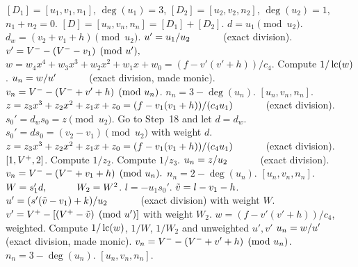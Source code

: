 \begin{algorithm}[H]
\caption{Genus 3 Split Model Degree 1 and 3 Addition with Two Up Adjusts\label{alg:g3explSPLIT13ADDUP2}}
\begin{algorithmic} [1]
\Require $[D_1] = [u_1,v_1,n_1]$, $\deg(u_1) = 3$, $[D_2] = [u_2,v_2,n_2]$, $\deg(u_2) = 1$, $n_1 + n_2 = 0$.
\Ensure $[D] = [u_n,v_n,n_n] = [D_1] + [D_2] $.
\algrule
\vspace{-2pt}
\State $d = u_1 \pmod{u_2}$.
    \State $d_w = (v_2 + v_1 + h) \pmod{u_2}$.
        \State $u' = u_1/u_2 \quad\quad\quad$ (exact division).
        \State $v' = V^{-} - (V^{-} - v_1) \pmod{u'},$
        \State $w = w_4x^4 + w_3x^3 + w_2x^2 +w_1x + w_0 = (f - v'(v' + h))/c_4$.
        \State Compute $1/\operatorname{lc}(w)$.
        \State $u_n = w/u' \quad\quad\quad$ (exact division, made monic).
        \State $v_n = V^{-} - (V^{-} + v' + h) \pmod{u_n}$.
        \State $n_n = 3 - \deg(u_n)$.
        \State \Return $[u_n,v_n,n_n]$.
    \EndIf
    \State $z = z_3x^3 + z_2x^2 + z_1x + z_0 = (f - v_1(v_1 + h))/(c_4u_1) \quad\quad\quad$ (exact division).  
    \State $s_0' = d_ws_0 = z \pmod{u_2}$.
    \State Go to Step~18 and let $d = d_w$.
\EndIf
\State $s_0' = ds_0 = (v_2 - v_1) \pmod{u_2}$ with weight $d$.
\State $z = z_3x^3 + z_2x^2 + z_1x + z_0 = (f - v_1(v_1 + h))/(c_4u_1) \quad\quad\quad$ (exact division).  
         \Return $[1,V^{+},2]$.
        \Else \hspace{3pt} Compute $1/z_2$.
        \EndIf
    \Else \hspace{3pt} Compute $1/z_3$.
    \EndIf
    \State $u_n = z/u_2 \quad\quad\quad$ (exact division).
    \State $v_n = V^{-} - (V^{-} + v_1 + h) \pmod{u_n}.$
    \State $n_n = 2 - \deg(u_n)$.
    \State \Return $[u_n,v_n,n_n]$.
\EndIf
\State $W = s_1'd, \quad\quad\quad W_2 = W^2$.
\State $l = -u_1s_0'$.
\State $\tilde{v} = l - v_1 - h$.
\State $u' = (s'(\tilde{v} - v_1) + k)/u_2 \quad\quad\quad$ (exact division) with weight $W$.
\State $v' = V^{+} - [(V^{+} - \tilde{v}) \pmod{u'}]$  with weight $W_2$.
\State $w = (f - v'(v' + h))/c_4$, weighted.
\State Compute $1/\operatorname{lc}(w)$, $1/W$, $1/W_2$ and unweighted $u',v'$
\State $u_n = w/u' \quad\quad\quad$ (exact division, made monic).
\State $v_n = V^{-} - (V^{-} + v' + h) \pmod{u_n}$.
\State $n_n = 3 - \deg(u_n)$.
\State \Return $[u_n,v_n,n_n]$.
\vspace{-2pt}
\end{algorithmic}
\end{algorithm}

\newpage

